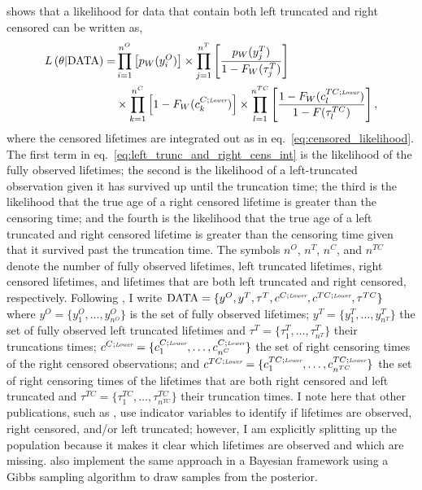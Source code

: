 \citet[eq.~(1)]{hong2009} shows that a likelihood for data that contain both left truncated and right censored can be written as,
\begin{align}
    \label{eq:left_trunc_and_right_cens_int}
    L\left(\theta|\hbox{DATA}\right) = & 
    \prod^{n^O}_{i = 1}\left[p_W(y^O_i) \right] \times
    \prod^{n^T}_{j = 1}\left[\frac{p_W(y^T_j)}{1 - F_W(\tau^T_j)} \right] \\
    & \times \prod^{n^C}_{k = 1}\left[1 - F_W(c^{C;\textit{\tiny{Lower}}}_k)\right]
    \times \prod^{n^{TC}}_{l = 1}\left[\frac{1 - F_W(c^{TC; \textit{\tiny{Lower}}}_l)}{1 - F(\tau^{TC}_l)}\right] \nonumber,
\end{align}
where the censored lifetimes are integrated out as in eq.~\eqref{eq:censored_likelihood}. The first term in eq.~\eqref{eq:left_trunc_and_right_cens_int} is the likelihood of the fully observed lifetimes; the second is the likelihood of a left-truncated observation given it has survived up until the truncation time; the third is the likelihood that the true age of a right censored lifetime is greater than the censoring time; and the fourth is the likelihood that the true age of a left truncated and right censored lifetime is greater than the censoring time given that it survived past the truncation time. The symbols $n^O$, $n^T$, $n^C$, and $n^{TC}$ denote the number of fully observed lifetimes, left truncated lifetimes, right censored lifetimes, and lifetimes that are both left truncated and right censored, respectively. Following \citet{hong2009}, I write $\text{DATA} = \{y^O, y^T, \tau^T, c^{C;\textit{\tiny{Lower}}}, c^{TC;\textit{\tiny{Lower}}}, \tau^{TC}\}$ where $y^O = \{y^O_1, \dots, y^O_{n^O}\}$ is the set of fully observed lifetimes; $y^T = \{y^T_1, \dots, y^T_{n^T}\}$ the set of fully observed left truncated lifetimes and $\tau^T = \{\tau^T_1, \dots, \tau^T_{n^T}\}$ their truncations times; $c^{C;\textit{\tiny{Lower}}} = \{c^{C;\textit{\tiny{Lower}}}_1, \dots, c^{C;\textit{\tiny{Lower}}}_{n^C}\}$ the set of right censoring times of the right censored observations; and $c^{TC;\textit{\tiny{Lower}}} = \{c^{TC;\textit{\tiny{Lower}}}_1, \dots, c^{TC;\textit{\tiny{Lower}}}_{n^{TC}}\}$ the set of right censoring times of the lifetimes that are both right censored and left truncated and $\tau^{TC} = \{\tau^{TC}_1, \dots, \tau^{TC}_{n^{TC}}\}$ their truncation times. I note here that other publications, such as \citet{hong2009}, use indicator variables to identify if lifetimes are observed, right censored, and/or left truncated; however, I am explicitly splitting up the population because it makes it clear which lifetimes are observed and which are missing. \citet{kundu2016} also implement the same approach in a Bayesian framework using a Gibbs sampling algorithm to draw samples from the posterior.

